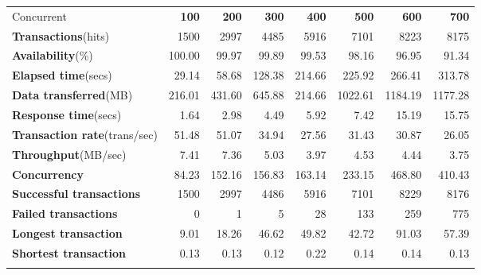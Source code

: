 \documentclass{morningstar}
\begin{document}
\begin{table}[htbp]
    \centering
    \begin{tabular}{lrrrrrrr}
    \thickhline
    Concurrent                           & \textbf{100} & \textbf{200} & \textbf{300} & \textbf{400} & \textbf{500} & \textbf{600} & \textbf{700} \\
    \thickhline
    \textbf{Transactions}(hits)          & 1500         & 2997         & 4485         & 5916         & 7101         & 8223         & 8175         \\
    \textbf{Availability}(\%)            & 100.00       & 99.97        & 99.89        & 99.53        & 98.16        & 96.95        & 91.34        \\
    \textbf{Elapsed time}(secs)          & 29.14        & 58.68        & 128.38       & 214.66       & 225.92       & 266.41       & 313.78       \\
    \textbf{Data transferred}(MB)        & 216.01       & 431.60       & 645.88       & 214.66       & 1022.61      & 1184.19      & 1177.28      \\
    \textbf{Response time}(secs)         & 1.64         & 2.98         & 4.49         & 5.92         & 7.42         & 15.19        & 15.75        \\
    \textbf{Transaction rate}(trans/sec) & 51.48        & 51.07        & 34.94        & 27.56        & 31.43        & 30.87        & 26.05        \\
    \textbf{Throughput}(MB/sec)          & 7.41         & 7.36         & 5.03         & 3.97         & 4.53         & 4.44         & 3.75         \\
    \textbf{Concurrency}                 & 84.23        & 152.16       & 156.83       & 163.14       & 233.15       & 468.80       & 410.43       \\
    \textbf{Successful transactions}     & 1500         & 2997         & 4486         & 5916         & 7101         & 8229         & 8176         \\
    \textbf{Failed transactions}         & 0            & 1            & 5            & 28           & 133          & 259          & 775          \\
    \textbf{Longest transaction}         & 9.01         & 18.26        & 46.62        & 49.82        & 42.72        & 91.03        & 57.39        \\
    \textbf{Shortest transaction}        & 0.13         & 0.13         & 0.12         & 0.22         & 0.14         & 0.14         & 0.13         \\
    \thickhline
    \end{tabular}
\end{table}
\end{document}
